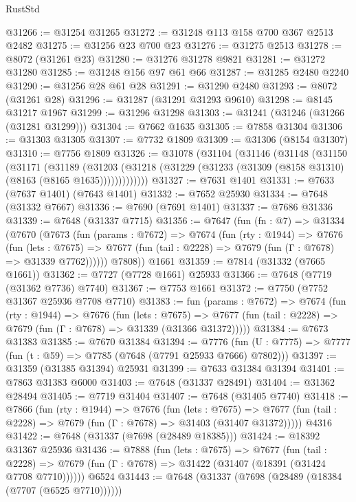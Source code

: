 \begin{lexlean}{RustStd}
\begin{coremodule}
{\begin{coremodule}
{{{{{{{{{{{{{{{{{{{{{{{{{{{{{{{{{{{{{{{{{{{{{{{{{{{{{@31266 := @31254 @31265
@31272 := @31248 @113 @158 @700 @367 @2513 @2482
@31275 := @31256 @23 @700 @23
@31276 := @31275 @2513
@31278 := @8072 (@31261 @23)
@31280 := @31276 @31278 @9821
@31281 := @31272 @31280
@31285 := @31248 @156 @97 @61 @66
@31287 := @31285 @2480 @2240
@31290 := @31256 @28 @61 @28
@31291 := @31290 @2480
@31293 := @8072 (@31261 @28)
@31296 := @31287 (@31291 @31293 @9610)
@31298 := @8145 @31217 @1967
@31299 := @31296 @31298
@31303 := @31241 (@31246 (@31266 (@31281 @31299)))
@31304 := @7662 @1635
@31305 := @7858 @31304
@31306 := @31303 @31305
@31307 := @7732 @1809
@31309 := @31306 (@8154 @31307)
@31310 := @7756 @1809
@31326 := @31078
    (@31104
      (@31146
        (@31148
          (@31150
            (@31171
              (@31189
                (@31203
                  (@31218 (@31229 (@31233 (@31309 (@8158 @31310) (@8163 (@8165 @1635)))))))))))))
@31327 := @7631 @1401
@31331 := @7633 (@7637 @1401) (@7643 @1401)
@31332 := @7652 @25930
@31334 := @7648 (@31332 @7667)
@31336 := @7690 (@7691 @1401)
@31337 := @7686 @31336
@31339 := @7648 (@31337 @7715)
@31356 := @7647
    (fun (fn : @7) =>
    @31334
      (@7670
        (@7673
          (fun (params : @7672) =>
          @7674
            (fun (rty : @1944) =>
            @7676
              (fun (lets : @7675) =>
              @7677 (fun (tail : @2228) => @7679 (fun (Γ : @7678) => @31339 @7762))))))
        @7808))
    @1661
@31359 := @7814 (@31332 (@7665 @1661))
@31362 := @7727 (@7728 @1661) @25933
@31366 := @7648 (@7719 (@31362 @7736) @7740)
@31367 := @7753 @1661
@31372 := @7750 (@7752 @31367 @25936 @7708 @7710)
@31383 := fun (params : @7672) =>
  @7674
    (fun (rty : @1944) =>
    @7676
      (fun (lets : @7675) =>
      @7677 (fun (tail : @2228) => @7679 (fun (Γ : @7678) => @31339 (@31366 @31372)))))
@31384 := @7673 @31383
@31385 := @7670 @31384
@31394 := @7776
    (fun (U : @7775) => @7777 (fun (t : @59) => @7785 (@7648 (@7791 @25933 @7666) @7802)))
@31397 := @31359 (@31385 @31394) @25931
@31399 := @7633 @31384 @31394
@31401 := @7863 @31383 @6000
@31403 := @7648 (@31337 @28491)
@31404 := @31362 @28494
@31405 := @7719 @31404
@31407 := @7648 (@31405 @7740)
@31418 := @7866
    (fun (rty : @1944) =>
    @7676
      (fun (lets : @7675) =>
      @7677 (fun (tail : @2228) => @7679 (fun (Γ : @7678) => @31403 (@31407 @31372)))))
    @4316
@31422 := @7648 (@31337 (@7698 (@28489 @18385)))
@31424 := @18392 @31367 @25936
@31436 := @7888
    (fun (lets : @7675) =>
    @7677
      (fun (tail : @2228) =>
      @7679 (fun (Γ : @7678) => @31422 (@31407 (@18391 (@31424 @7708 @7710))))))
    @6524
@31443 := @7648 (@31337 (@7698 (@28489 (@18384 (@7707 (@6525 @7710))))))
}}}}}}}}}}}}}}}}}}}}}}}}}}}}}}}}}}}}}}}}}}}}}}}}}}}}}
\end{coremodule}}
\end{coremodule}
\end{lexlean}
